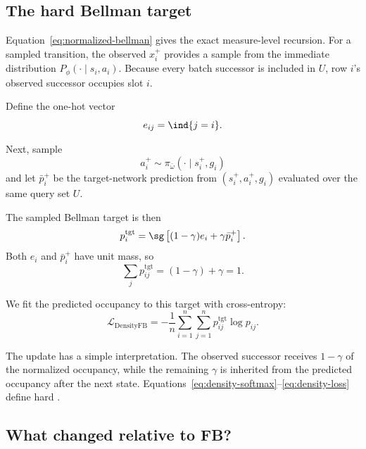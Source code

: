 \subsection{The hard Bellman target}

Equation~\ref{eq:normalized-bellman} gives the exact measure-level recursion.
For a sampled transition, the observed $x_i^+$ provides a sample from the immediate distribution $P_\phi(\cdot\mid s_i,a_i)$.
Because every batch successor is included in $U$, row $i$'s observed successor occupies slot $i$.

Define the one-hot vector
\begin{equation}
    e_{ij} = \ind{j=i}.
\end{equation}

Next, sample
\begin{equation}
a_i^+
\sim
\pi_{\bar\omega}(\cdot\mid s_i^+,g_i)
\end{equation}
and let $\bar p_i^+$ be the target-network prediction from $(s_i^+,a_i^+,g_i)$ evaluated over the same query set $U$.

The sampled Bellman target is then
\begin{equation}
\label{eq:hard-target}
    p_i^{\mathrm{tgt}} = \sg\left[ (1-\gamma)e_i + \gamma\bar p_i^+ \right].
\end{equation}
Both $e_i$ and $\bar p_i^+$ have unit mass, so
\begin{equation}
    \sum_j p_{ij}^{\mathrm{tgt}} = (1-\gamma)+\gamma = 1.
\end{equation}

We fit the predicted occupancy to this target with cross-entropy:
\begin{equation}
\label{eq:density-loss}
\mathcal L_{\mathrm{DensityFB}} = - \frac1n \sum_{i=1}^n \sum_{j=1}^n p_{ij}^{\mathrm{tgt}} \log p_{ij}.
\end{equation}

The update has a simple interpretation.
The observed successor receives $1-\gamma$ of the normalized occupancy, while the remaining $\gamma$ is inherited from the predicted occupancy after the next state.
Equations~\ref{eq:density-softmax}--\ref{eq:density-loss} define hard \DensityFB{}.

\subsection{What changed relative to FB?}

